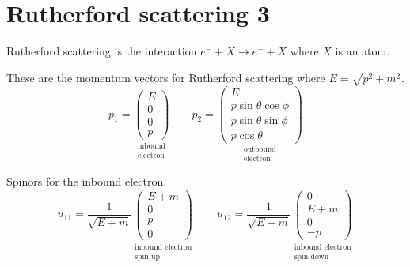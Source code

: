 

\section*{Rutherford scattering 3}

Rutherford scattering is the interaction
$e^-+X\rightarrow e^-+X$ where $X$ is an atom.

\begin{center}
\end{center}

These are the momentum vectors for Rutherford scattering where $E=\sqrt{p^2+m^2}$.
\begin{equation*}
p_1=\underset{\substack{\text{inbound}\\ \text{electron}}}
{\begin{pmatrix}E\\0\\0\\p\end{pmatrix}}
\qquad
p_2=\underset{\substack{\text{outbound}\\ \text{electron}}}
{\begin{pmatrix}
E\\
p\sin\theta\cos\phi\\
p\sin\theta\sin\phi\\
p\cos\theta
\end{pmatrix}}
\end{equation*}

Spinors for the inbound electron.
\begin{equation*}
u_{11}=\frac{1}{\sqrt{E+m}}
\underset{\substack{\text{inbound electron}\\ \text{spin up}}}
{\begin{pmatrix}E+m\\0\\p\\0\end{pmatrix}}
\qquad
u_{12}=\frac{1}{\sqrt{E+m}}
\underset{\substack{\text{inbound electron}\\ \text{spin down}}}
{\begin{pmatrix}0\\E+m\\0\\-p\end{pmatrix}}
\end{equation*}

